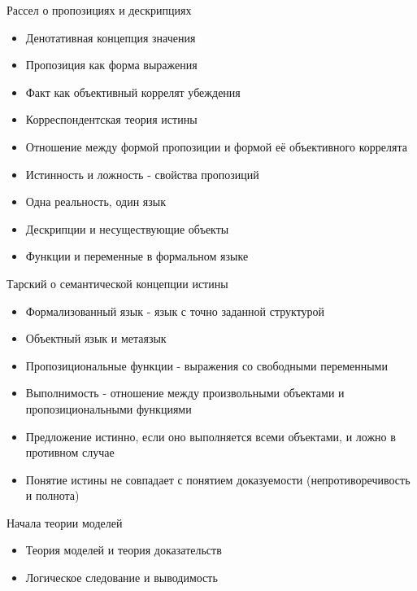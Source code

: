 \documentclass{beamer}
\begin{document}
\begin{frame}{Рассел о пропозициях и дескрипциях}
  \begin{itemize}
    \item Денотативная концепция значения
    \item Пропозиция как форма выражения
    \item Факт как объективный коррелят убеждения 
    \item Корреспондентская теория истины
    \item Отношение между формой пропозиции и формой её объективного коррелята
    \item Истинность и ложность - свойства пропозиций
    \item Одна реальность, один язык
    \item Дескрипции и несуществующие объекты
    \item Функции и переменные в формальном языке
  \end{itemize}
\end{frame}

\begin{frame}{Тарский о семантической концепции истины}
  \begin{itemize}
    \item Формализованный язык - язык с точно заданной структурой
    \item Объектный язык и метаязык
    \item Пропозициональные функции - выражения со свободными переменными
    \item Выполнимость - отношение между произвольными объектами и пропозициональными функциями
    \item Предложение истинно, если оно выполняется всеми объектами, и ложно в противном случае
    \item Понятие истины не совпадает с понятием доказуемости (непротиворечивость и полнота)
  \end{itemize}
\end{frame}

\begin{frame}{Начала теории моделей}
  \begin{itemize}
    \item Теория моделей и теория доказательств
    \item Логическое следование и выводимость
  \end{itemize}
\end{frame}
\end{document}
